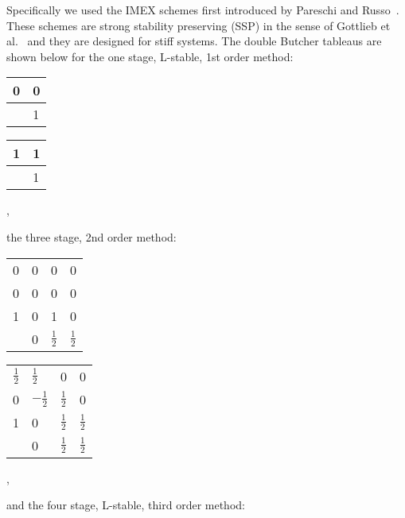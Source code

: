     Specifically we used the IMEX schemes first introduced by Pareschi and
    Russo~\cite{article:pareschi2000IMEX, article:pareschi2005IMEX}.
    These schemes are strong stability preserving (SSP) in the sense of Gottlieb et
    al.~\cite{gottlieb2001strong} and they are designed for stiff systems.
    The double Butcher tableaus are shown below for the one stage, L-stable, 1st order
    method:
    \begin{center}
      \begin{tabular}{r|l}
        0 & 0 \\
        \midrule
          & 1
      \end{tabular}\hspace{0.5cm}
      \begin{tabular}{r|l}
        1 & 1 \\
        \midrule
          & 1
      \end{tabular},
    \end{center}
    the three stage, 2nd order method:
    \begin{center}
      \begin{tabular}{r|lll}
        0 & 0 & 0 & 0 \\
        0 & 0 & 0 & 0 \\
        1 & 0 & 1 & 0 \\
        \midrule
          & 0 & \(\frac{1}{2}\) & \(\frac{1}{2}\) \\
      \end{tabular}\hspace{0.5cm}
      \begin{tabular}{r|lll}
        \(\frac{1}{2}\) & \(\frac{1}{2}\) & 0 & 0 \\
        0 & \(-\frac{1}{2}\) & \(\frac{1}{2}\) & 0 \\
        1 & 0 & \(\frac{1}{2}\) & \(\frac{1}{2}\) \\
        \midrule
          & 0 & \(\frac{1}{2}\) & \(\frac{1}{2}\) \\
      \end{tabular},
    \end{center}
    and the four stage, L-stable, third order method:
